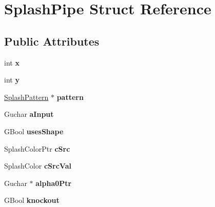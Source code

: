 \hypertarget{struct_splash_pipe}{}\section{Splash\+Pipe Struct Reference}
\label{struct_splash_pipe}
\subsection*{Public Attributes}
\begin{DoxyCompactItemize}
\item 
\mbox{\label{struct_splash_pipe_ab5b118c2f80515585bedc8c928afdf4a}} 
int {\bfseries x}
\item 
\mbox{\label{struct_splash_pipe_a5e3e470a6cd97eb9e51312b162a4b664}} 
int {\bfseries y}
\item 
\mbox{\label{struct_splash_pipe_af12801786cf9abc497a3f7e22037a4a4}} 
\hyperlink{class_splash_pattern}{Splash\+Pattern} $\ast$ {\bfseries pattern}
\item 
\mbox{\label{struct_splash_pipe_ab90315f4b956bee00a77f892fa00ef01}} 
Guchar {\bfseries a\+Input}
\item 
\mbox{\label{struct_splash_pipe_ad82547053edd4737212e4898913f57c5}} 
G\+Bool {\bfseries uses\+Shape}
\item 
\mbox{\label{struct_splash_pipe_a44d51da35b999dd7433adb22966bc06f}} 
Splash\+Color\+Ptr {\bfseries c\+Src}
\item 
\mbox{\label{struct_splash_pipe_aed0791336d5de46461681a396c04933b}} 
Splash\+Color {\bfseries c\+Src\+Val}
\item 
\mbox{\label{struct_splash_pipe_a58cbfce36e3c951e884c7b44877897d3}} 
Guchar $\ast$ {\bfseries alpha0\+Ptr}
\item 
\mbox{\label{struct_splash_pipe_a672d6f0248acac4ac3dc60a66869aae8}} 
G\+Bool {\bfseries knockout}
\item 
\mbox{\label{struct_splash_pipe_ae430a265ce95bd992f38079bd8dbb1ce}} 

\end{DoxyCompactItemize}
